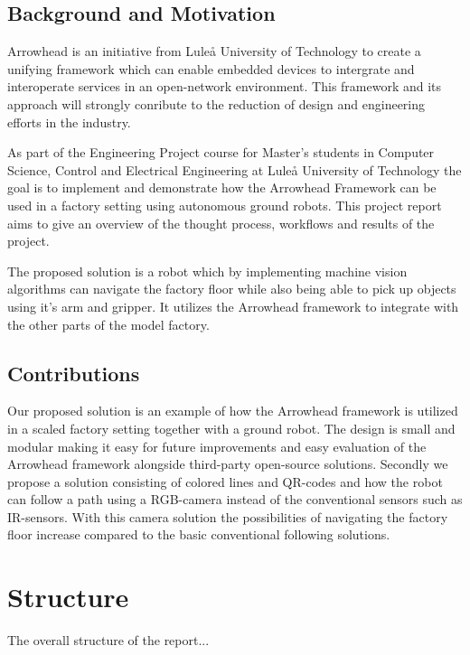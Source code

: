 \subsection{Background and Motivation}
Arrowhead is an initiative from Luleå University of Technology to create a unifying framework which can enable embedded devices to intergrate and interoperate services in an open-network environment. This framework and its approach will strongly conribute to the reduction of design and engineering efforts in the industry. 

As part of the Engineering Project course for Master's students in Computer Science, Control and Electrical Engineering at Luleå University of Technology the goal is to implement and demonstrate how the Arrowhead Framework can be used in a factory setting using autonomous ground robots. This project report aims to give an overview of the thought process, workflows and results of the project.

The proposed solution is a robot which by implementing machine vision algorithms can navigate the factory floor while also being able to pick up objects using it's arm and gripper. It utilizes the Arrowhead framework to integrate with the other parts of the model factory. 

\subsection{Contributions}
Our proposed solution is an example of how the Arrowhead framework is utilized in a scaled factory setting together with a ground robot. The design is small and modular making it easy for future improvements and easy evaluation of the Arrowhead framework alongside third-party open-source solutions. Secondly we propose a solution consisting of colored lines and QR-codes and how the robot can follow a path using a RGB-camera instead of the conventional sensors such as IR-sensors. With this camera solution the possibilities of navigating the factory floor increase compared to the basic conventional following solutions. 
\section*{Structure}
The overall structure of the report...
